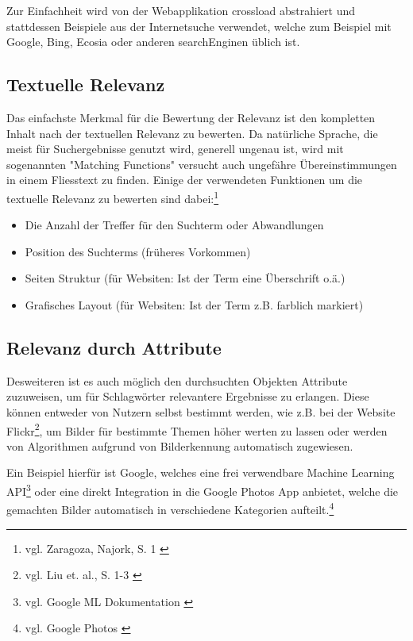Zur Einfachheit wird von der Webapplikation \gls{crossload} abstrahiert und stattdessen Beispiele aus der Internetsuche verwendet, welche zum Beispiel mit Google, Bing, Ecosia oder anderen \gls{searchEngine}n üblich ist.

\subsection{Textuelle Relevanz}
\label{sub:relevanceText}
Das einfachste Merkmal für die Bewertung der Relevanz ist den kompletten Inhalt nach der textuellen Relevanz zu bewerten.
Da natürliche Sprache, die meist für Suchergebnisse genutzt wird, generell ungenau ist, wird mit sogenannten "Matching Functions" versucht auch ungefähre Übereinstimmungen in einem Fliesstext zu finden.
Einige der verwendeten Funktionen um die textuelle Relevanz zu bewerten sind dabei:\footnote{vgl. Zaragoza, Najork, S. 1 \cite{zaragoza2018}}

\begin{itemize}
  \item Die Anzahl der Treffer für den Suchterm oder Abwandlungen
  \item Position des Suchterms (früheres Vorkommen)
  \item Seiten Struktur (für Websiten: Ist der Term eine Überschrift o.ä.)
  \item Grafisches Layout (für Websiten: Ist der Term z.B. farblich markiert)
\end{itemize}
\subsection{Relevanz durch Attribute}
\label{sub:relevanceAttribute}
Desweiteren ist es auch möglich den durchsuchten Objekten Attribute zuzuweisen, um für Schlagwörter relevantere Ergebnisse zu erlangen.
Diese können entweder von Nutzern selbst bestimmt werden, wie z.B. bei der Website Flickr\footnote{vgl. Liu et. al., S. 1-3 \cite{liu2009}}, um Bilder für bestimmte Themen höher werten zu lassen oder werden von Algorithmen aufgrund von Bilderkennung automatisch zugewiesen.

Ein Beispiel hierfür ist Google, welches eine frei verwendbare Machine Learning API\footnote{vgl. Google ML Dokumentation \cite{googledevelopers2022}} oder eine direkt Integration in die Google Photos App anbietet, welche die gemachten Bilder automatisch in verschiedene Kategorien aufteilt.\footnote{vgl. Google Photos \cite{googlephotos2022}}


